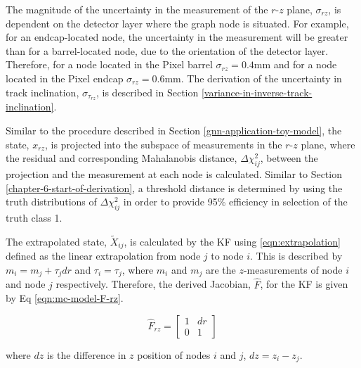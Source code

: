 The magnitude of the uncertainty in the measurement of the $r$-$z$ plane, $\sigma_{rz}$, is dependent on the detector layer where the graph node is situated. For example, for an endcap-located node, the uncertainty in the measurement will be greater than for a barrel-located node, due to the orientation of the detector layer. Therefore, for a node located in the Pixel barrel $\sigma_{rz} = 0.4$mm and for a node located in the Pixel endcap $\sigma_{rz} = 0.6$mm. The derivation of the uncertainty in track inclination, $\sigma_{\tau_{rz}}$, is described in Section \ref{variance-in-inverse-track-inclination}. 

Similar to the procedure described in Section \ref{gnn-application-toy-model}, the state, $x_{rz}$, is projected into the subspace of measurements in the $r$-$z$ plane, where the residual and corresponding Mahalanobis distance, $\Delta \chi_{ij}^{2}$, between the projection and the measurement at each node is calculated. Similar to Section \ref{chapter-6-start-of-derivation}, a threshold distance is determined by using the truth distributions of $\Delta \chi_{ij}^{2}$ in order to provide 95\% efficiency in selection of the truth class 1. 




The extrapolated state, $\widetilde{X}_{ij}$, is calculated by the KF using \eqref{eqn:extrapolation} defined as the linear extrapolation from node $j$ to node $i$. This is described by $m_i = m_j + \tau_j dr$ and $\tau_i = \tau_j$, where $m_i$ and $m_j$ are the $z$-measurements of node $i$ and node $j$ respectively. Therefore, the derived Jacobian, $\hat{F}$, for the KF is given by Eq \eqref{eqn:mc-model-F-rz}.


\begin{equation}
\hat{F}_{rz} = \begin{bmatrix} 1 & dr \\ 0 & 1 \end{bmatrix}
\label{eqn:mc-model-F-rz}
\end{equation}

where $dz$ is the difference in $z$ position of nodes $i$ and $j$, $dz = z_i - z_j$.






